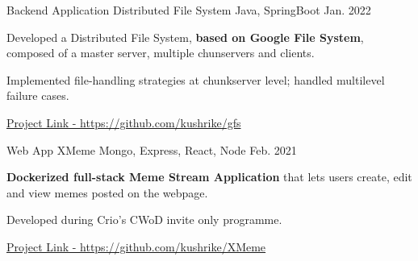 

\begin{cventries}


\cventry
    {Backend Application} %
    {Distributed File System} %
    {Java, SpringBoot} %
    {Jan. 2022} %
    {
      \begin{cvitems} %
        \item {Developed a Distributed File System, \textbf{based on Google File System}, composed of a master server, multiple chunservers and clients.}
        \item {Implemented file-handling strategies at chunkserver level; handled multilevel failure cases.}
        \item {\href{https://github.com/kushrike/gfs}{Project Link - https://github.com/kushrike/gfs}}
      \end{cvitems}
    }


\cventry
    {Web App} %
    {XMeme} %
    {Mongo, Express, React, Node} %
    {Feb. 2021} %
    {
      \begin{cvitems} %
        \item {\textbf{Dockerized full-stack Meme Stream Application} that lets users create, edit and view memes posted on the webpage.}
        \item {Developed during Crio's CWoD invite only programme.}
        \item {\href{https://github.com/kushrike/XMeme}{Project Link - https://github.com/kushrike/XMeme}}
      \end{cvitems}
    }
  


\end{cventries}
